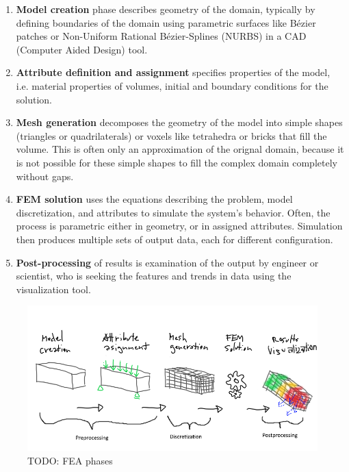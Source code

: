 \begin{enumerate}
    \item \textbf{Model creation} phase describes geometry of the domain, typically by defining boundaries of the domain using parametric surfaces like Bézier patches or Non-Uniform Rational Bézier-Splines (NURBS) \cite{XXX} in a CAD (Computer Aided Design) tool.
    \item \textbf{Attribute definition and assignment} specifies properties of the model, i.e. material properties of volumes, initial and boundary conditions for the solution.
    \item \textbf{Mesh generation} decomposes the geometry of the model into simple shapes (triangles or quadrilaterals) or voxels like tetrahedra or bricks that fill the volume. This is often only an approximation of the orignal domain, because it is not possible for these simple shapes to fill the complex domain completely without gaps.
    \item \textbf{FEM solution} uses the equations describing the problem, model discretization, and attributes to simulate the system's behavior. Often, the process is parametric either in geometry, or in assigned attributes. Simulation then produces multiple sets of output data, each for different configuration.
    \item \textbf{Post-processing} of results is examination of the output by engineer or scientist, who is seeking the features and trends in data using the visualization tool.
\end{enumerate}

\begin{figure}[H]
    \centering
    \includegraphics[width=\textwidth]{figures/FEA-phases}
    \decoRule
    \caption[TODO: ]{TODO: FEA phases}
    \label{fig:FEA-phases}
\end{figure}

